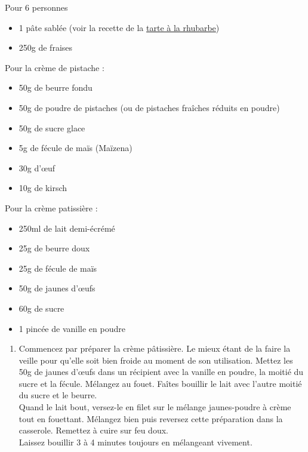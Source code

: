 \medskip
\phantom{.}

\bigskip
{}
{Pour 6 personnes}{\begin{itemize}
\item 1 pâte sablée (voir la recette de la \hyperref[TarteRhubarbe]{tarte à la rhubarbe})
\item 250g de fraises
\end{itemize}
Pour la crème de pistache :
\begin{itemize}
\item 50g de beurre fondu
\item 50g de poudre de pistaches (ou de pistaches fraîches réduits en poudre)
\item 50g de sucre glace
\item 5g de fécule de maïs (Maïzena)
\item 30g d'\oe uf
\item 10g de kirsch
\end{itemize}
Pour la crème patissière :
\begin{itemize}
\item 250ml de lait demi-écrémé
\item 25g de beurre doux
\item 25g de fécule de maïs
\item 50g de jaunes d'\oe ufs
\item 60g de sucre
\item 1 pincée de vanille en poudre
\end{itemize}
}{\begin{enumerate}
\item Commencez par préparer la crème pâtissière. Le mieux étant de la faire la veille pour qu'elle soit bien froide au moment de son utilisation. Mettez les 50g de jaunes d'\oe ufs dans un récipient avec la vanille en poudre, la moitié du sucre et la fécule. Mélangez au fouet. Faîtes bouillir le lait avec l'autre moitié du sucre et le beurre.\\
Quand le lait bout, versez-le en filet sur le mélange jaunes-poudre à crème tout en fouettant. Mélangez bien puis reversez cette préparation dans la casserole. Remettez à cuire sur feu doux.\\
Laissez bouillir 3 à 4 minutes toujours en mélangeant vivement.\\

\end{enumerate}}
